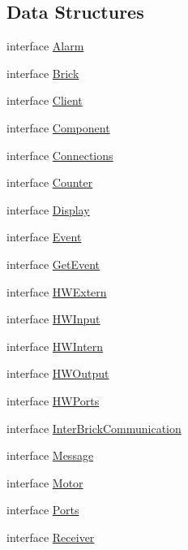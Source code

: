 \subsection*{Data Structures}
\begin{DoxyCompactItemize}
\item 
interface \hyperlink{interfaceshootingmachineemfmodel_1_1_alarm}{Alarm}
\item 
interface \hyperlink{interfaceshootingmachineemfmodel_1_1_brick}{Brick}
\item 
interface \hyperlink{interfaceshootingmachineemfmodel_1_1_client}{Client}
\item 
interface \hyperlink{interfaceshootingmachineemfmodel_1_1_component}{Component}
\item 
interface \hyperlink{interfaceshootingmachineemfmodel_1_1_connections}{Connections}
\item 
interface \hyperlink{interfaceshootingmachineemfmodel_1_1_counter}{Counter}
\item 
interface \hyperlink{interfaceshootingmachineemfmodel_1_1_display}{Display}
\item 
interface \hyperlink{interfaceshootingmachineemfmodel_1_1_event}{Event}
\item 
interface \hyperlink{interfaceshootingmachineemfmodel_1_1_get_event}{Get\-Event}
\item 
interface \hyperlink{interfaceshootingmachineemfmodel_1_1_h_w_extern}{H\-W\-Extern}
\item 
interface \hyperlink{interfaceshootingmachineemfmodel_1_1_h_w_input}{H\-W\-Input}
\item 
interface \hyperlink{interfaceshootingmachineemfmodel_1_1_h_w_intern}{H\-W\-Intern}
\item 
interface \hyperlink{interfaceshootingmachineemfmodel_1_1_h_w_output}{H\-W\-Output}
\item 
interface \hyperlink{interfaceshootingmachineemfmodel_1_1_h_w_ports}{H\-W\-Ports}
\item 
interface \hyperlink{interfaceshootingmachineemfmodel_1_1_inter_brick_communication}{Inter\-Brick\-Communication}
\item 
interface \hyperlink{interfaceshootingmachineemfmodel_1_1_message}{Message}
\item 
interface \hyperlink{interfaceshootingmachineemfmodel_1_1_motor}{Motor}
\item 
interface \hyperlink{interfaceshootingmachineemfmodel_1_1_ports}{Ports}
\item 
interface \hyperlink{interfaceshootingmachineemfmodel_1_1_receiver}{Receiver}

\end{DoxyCompactItemize}
